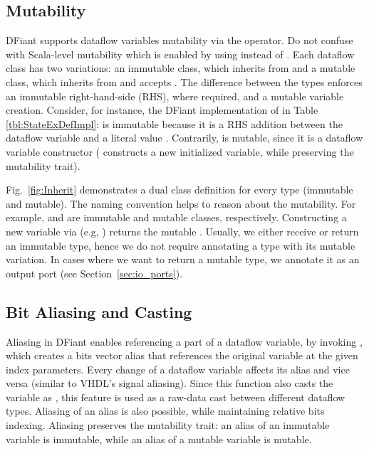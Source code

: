 \subsection{Mutability}
\label{sec:mutability}
DFiant supports dataflow variables mutability via the \code{:=} operator. Do not confuse with Scala-level mutability which is enabled by using  instead of . Each dataflow class has two variations: an immutable class, which inherits from  and a mutable class, which inherits from  and accepts \code{:=}. The difference between the types enforces an immutable right-hand-side (RHS), where required, and a mutable variable creation. Consider, for instance, the DFiant implementation of  in Table \ref{tbl:StateExDefImpl}:  is immutable because it is a RHS addition between the dataflow variable  and a literal value . Contrarily,  is mutable, since it is a dataflow variable constructor ( constructs a new initialized variable, while preserving the mutability trait). 

Fig.~\ref{fig:Inherit} demonstrates a dual class definition for every type  (immutable and mutable). The naming convention helps to reason about the mutability. For example,  and  are immutable and mutable classes, respectively. Constructing a new variable via  (e.g, ) returns the mutable . Usually, we either receive or return an immutable type, hence we do not require annotating a type with its mutable variation. In cases where we want to return a mutable type, we annotate it as an output port (see Section~\ref{sec:io_ports}).





\subsection{Bit Aliasing and Casting}
Aliasing in DFiant enables referencing a part of a dataflow variable, by invoking , which creates a bits vector alias that references the original variable at the given index parameters. Every change of a dataflow variable affects its alias and vice versa (similar to VHDL's signal aliasing). Since this function also casts the variable as , this feature is used as a raw-data cast between different dataflow types. Aliasing of an alias is also possible, while maintaining relative bits indexing. Aliasing preserves the mutability trait: an alias of an immutable variable is immutable, while an alias of a mutable variable is mutable. 



